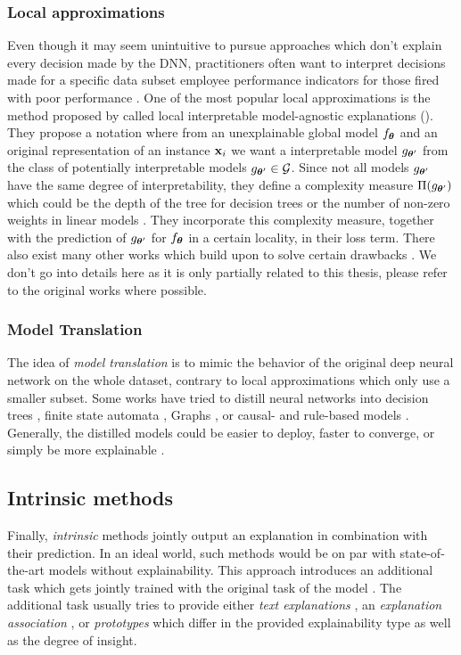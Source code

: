 \subsubsection{Local approximations}
Even though it may seem unintuitive to pursue approaches which don't explain every decision made by the DNN, practitioners often want to interpret decisions made for a specific data subset \eg employee performance indicators for those fired with poor performance \citep{xie2020explainable}. 
One of the most popular local approximations is the method proposed by \citet{Ribeiro0G16} called local interpretable model-agnostic explanations (\lime). They propose a notation where from an unexplainable global model $f_{\boldsymbol{\theta}}$ and an original representation of an instance $\mathbf{x}_i$ we want a interpretable model $g_{\boldsymbol{\theta}^\prime}$ from the class of potentially interpretable models $g_{\boldsymbol{\theta}^\prime} \in \mathcal{G}$. Since not all models $g_{\boldsymbol{\theta}^\prime}$ have the same degree of interpretability, they define a complexity measure $\Pi(g_{\boldsymbol{\theta}^\prime})$ which could be the depth of the tree for decision trees or the number of non-zero weights in linear models \citep{Ribeiro0G16}. They incorporate this complexity measure, together with the prediction of $g_{\boldsymbol{\theta}^\prime}$ for $f_{\boldsymbol{\theta}}$ in a certain locality, in their loss term. There also exist many other works which build upon \lime{} to solve certain drawbacks  \citep{ElenbergDFK17, Ribeiro0G18}. We don't go into details here as it is only partially related to this thesis, please refer to the original works where possible.

\subsubsection{Model Translation}
The idea of \emph{model translation} is to mimic the behavior of the original deep neural network on the whole dataset, contrary to local approximations which only use a smaller subset. Some works have tried to distill neural networks into decision trees \citep{FrosstH17, tan2018learning, ZhangYMW19}, finite state automata \citep{HouZ20}, Graphs \citep{ZhangCWZ17, ZhangCSWZ18, ZhangYMW19}, or causal- and rule-based models \citep{harradon2018causal, MurdochS17}. Generally, the distilled models could be easier to deploy, faster to converge, or simply be more explainable \citep{xie2020explainable}.

\subsection{Intrinsic methods}
Finally, \emph{intrinsic} methods jointly output an explanation in combination with their prediction. In an ideal world, such methods would be on par with state-of-the-art models without explainability. This approach introduces an additional task which gets jointly trained with the original task of the model \citep{xie2020explainable}. The additional task usually tries to provide either \emph{text explanations} \citep{HindWCCDMRV19, CamburuRLB18, HendricksARDSD16, ZellersBFC19}, an \emph{explanation association} \citep{DongSZZ17, LeiBJ16, IyerLL0SS18, Alvarez-MelisJ18}, or \emph{prototypes} \citep{LiLCR18, ChenLTBRS19} which differ in the provided explainability type as well as the degree of insight. 

